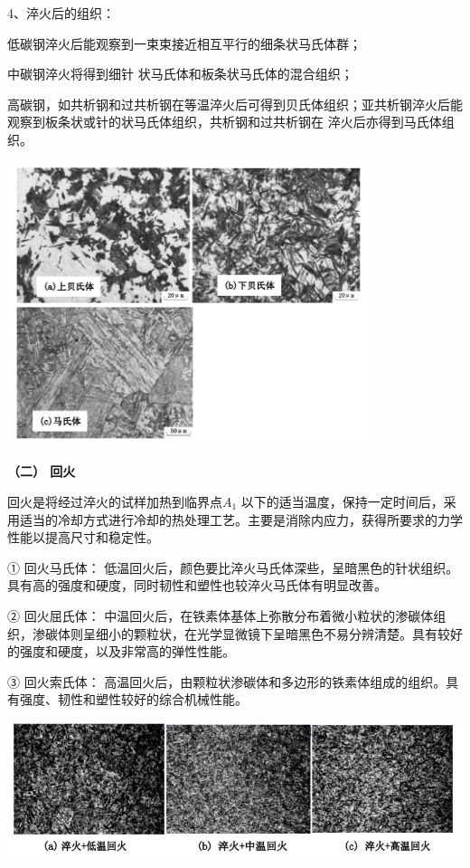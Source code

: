 \documentclass[a4paper,utf8]{article}
\begin{document}
4、淬火后的组织：

低碳钢淬火后能观察到一束束接近相互平行的细条状马氏体群；

中碳钢淬火将得到细针
状马氏体和板条状马氏体的混合组织；

高碳钢，如共析钢和过共析钢在等温淬火后可得到贝氏体组织；亚共析钢淬火后能观察到板条状或针的状马氏体组织，共析钢和过共析钢在
淬火后亦得到马氏体组织。

\begin{center}
    \includegraphics[width=300pt]{6.png}
\end{center}

\textbf{（二） 回火}

回火是将经过淬火的试样加热到临界点$A_1$ 以下的适当温度，保持一定时间后，采用适当的冷却方式进行冷却的热处理工艺。主要是消除内应力，获得所要求的力学性能以提高尺寸和稳定性。

① 回火马氏体：
低温回火后，颜色要比淬火马氏体深些，呈暗黑色的针状组织。 具有高的强度和硬度，同时韧性和塑性也较淬火马氏体有明显改善。

② 回火屈氏体：
中温回火后，在铁素体基体上弥散分布着微小粒状的渗碳体组织，渗碳体则呈细小的颗粒状，在光学显微镜下呈暗黑色不易分辨清楚。具有较好的强度和硬度，以及非常高的弹性性能。

③ 回火索氏体：
高温回火后，由颗粒状渗碳体和多边形的铁素体组成的组织。具有强度、韧性和塑性较好的综合机械性能。

\begin{center}
    \includegraphics[width=400pt]{2.png}
\end{center}
\end{document}
